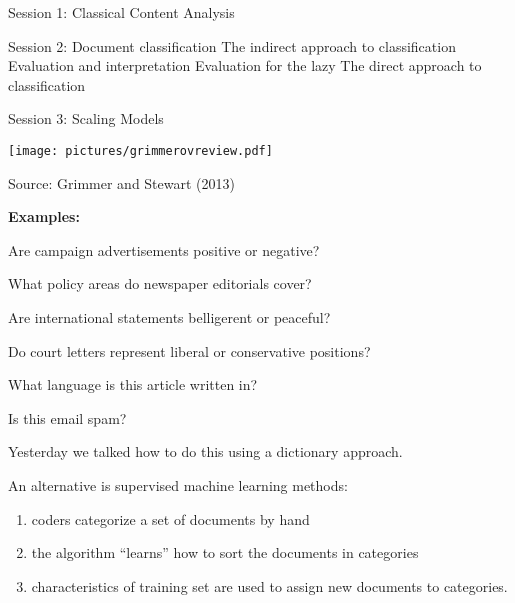 \documentclass{mediumfoils}
\author{\textbf{Will Lowe} (University of Mannheim)}
\date{}
\begin{document}
\maketitle

%
%
%
%
%


%


Session 1: Classical Content Analysis

Session 2: 
\ita
\itm Document classification 
\ita
\itm The indirect approach to classification
\itm Evaluation and interpretation
\itm Evaluation for the lazy
\itm The direct approach to classification
\itz
\itz

Session 3: Scaling Models



\centerline{\texttt{[image: pictures/grimmerovreview.pdf]}}
\centerline{\footnotesize Source: Grimmer and Stewart (2013)}







{\bf Examples:}

Are campaign advertisements positive or negative?

What  policy areas do newspaper editorials cover?

Are international statements belligerent or peaceful?

Do court letters represent liberal or conservative positions?

What language is this article written in?

Is this email spam?


Yesterday we talked how to do this using a dictionary approach.

An alternative is supervised machine learning methods:
\begin{enumerate}

\item coders categorize a set of documents by hand
\item the algorithm ``learns'' how to sort the documents in categories
\item  characteristics of training set are used  to assign new documents to categories.
\end{enumerate}
\end{document}
